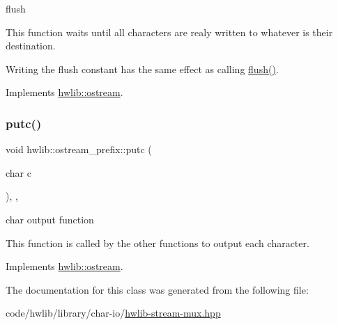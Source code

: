 flush

This function waits until all characters are realy written to whatever is their destination.

Writing the flush constant has the same effect as calling \hyperlink{classhwlib_1_1ostream__prefix_a1e7f7655a749a24d81aafdc4ef93ac30}{flush()}. 

Implements \hyperlink{classhwlib_1_1ostream_a5f43f08159d2733e02805f134598f96a}{hwlib\+::ostream}.

\mbox{\label{classhwlib_1_1ostream__prefix_a9a3bc3759d39b0d93202ff4aaacda270}} 
\subsubsection{\texorpdfstring{putc()}{putc()}}
{\footnotesize\ttfamily void hwlib\+::ostream\+\_\+prefix\+::putc (\begin{DoxyParamCaption}\item[{char}]{c }\end{DoxyParamCaption})\hspace{0.3cm}{\ttfamily [inline]}, {\ttfamily [override]}, {\ttfamily [virtual]}}

char output function

This function is called by the other functions to output each character. 

Implements \hyperlink{classhwlib_1_1ostream_a3b2b77c9e933b76bd6ddd85b9883a31b}{hwlib\+::ostream}.



The documentation for this class was generated from the following file\+:\begin{DoxyCompactItemize}
\item 
code/hwlib/library/char-\/io/\hyperlink{hwlib-stream-mux_8hpp}{hwlib-\/stream-\/mux.\+hpp}\end{DoxyCompactItemize}
